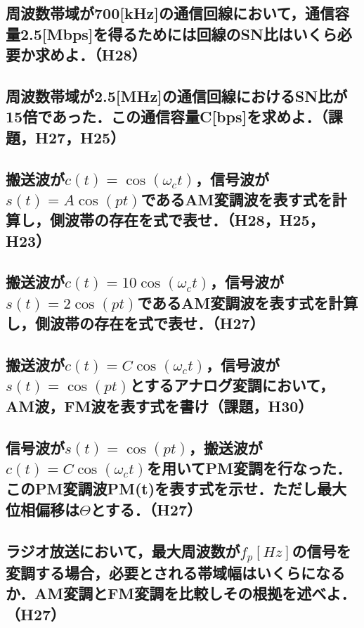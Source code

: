\newpage
\subsection{周波数帯域が700[kHz]の通信回線において，通信容量2.5[Mbps]を得るためには回線のSN比はいくら必要か求めよ．（H28）}
\vspace{7cm}

\subsection{周波数帯域が2.5[MHz]の通信回線におけるSN比が15倍であった．この通信容量C[bps]を求めよ．（課題，H27，H25）}
\vspace{7cm}

\subsection{搬送波が$c(t) = \cos(\omega_c t)$，信号波が$s(t) = A \cos(pt)$であるAM変調波を表す式を計算し，側波帯の存在を式で表せ．（H28，H25，H23）}
\vspace{7cm}

\newpage
\subsection{搬送波が$c(t) = 10\cos(\omega_c t)$，信号波が$s(t) = 2 \cos(pt)$であるAM変調波を表す式を計算し，側波帯の存在を式で表せ．（H27）}
\vspace{7cm}

\subsection{搬送波が$c(t) = C\cos(\omega_c t)$，信号波が$s(t) = \cos(pt)$とするアナログ変調において，AM波，FM波を表す式を書け（課題，H30）}
\vspace{7cm}

\subsection{信号波が$s(t) = \cos(pt)$，搬送波が$c(t) = C \cos(\omega_c t)$を用いてPM変調を行なった．このPM変調波PM(t)を表す式を示せ．ただし最大位相偏移は$\Theta$とする．（H27）}
\vspace{7cm}

\newpage
\subsection{ラジオ放送において，最大周波数が$f_p[Hz]$の信号を変調する場合，必要とされる帯域幅はいくらになるか．AM変調とFM変調を比較しその根拠を述べよ．（H27）}
\vspace{7cm}


